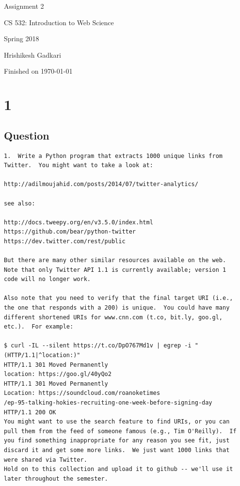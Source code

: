\documentclass[letterpaper,11pt]{article}
\begin{document}
\begin{titlepage}

\begin{center}

\Huge{Assignment 2}

\Large{CS 532:  Introduction to Web Science}

\Large{Spring 2018}

\Large{Hrishikesh Gadkari}

\Large Finished on \today

\end{center}

\end{titlepage}

\newpage


\section*{1}


\subsection*{Question}

\begin{verbatim}
1.  Write a Python program that extracts 1000 unique links from
Twitter.  You might want to take a look at:

http://adilmoujahid.com/posts/2014/07/twitter-analytics/

see also:

http://docs.tweepy.org/en/v3.5.0/index.html
https://github.com/bear/python-twitter
https://dev.twitter.com/rest/public

But there are many other similar resources available on the web.
Note that only Twitter API 1.1 is currently available; version 1
code will no longer work.

Also note that you need to verify that the final target URI (i.e.,
the one that responds with a 200) is unique.  You could have many
different shortened URIs for www.cnn.com (t.co, bit.ly, goo.gl,
etc.).  For example:

$ curl -IL --silent https://t.co/DpO767Md1v | egrep -i "(HTTP/1.1|^location:)"
HTTP/1.1 301 Moved Permanently
location: https://goo.gl/40yQo2
HTTP/1.1 301 Moved Permanently
Location: https://soundcloud.com/roanoketimes
/ep-95-talking-hokies-recruiting-one-week-before-signing-day
HTTP/1.1 200 OK
You might want to use the search feature to find URIs, or you can
pull them from the feed of someone famous (e.g., Tim O'Reilly).  If
you find something inappropriate for any reason you see fit, just
discard it and get some more links.  We just want 1000 links that
were shared via Twitter.
Hold on to this collection and upload it to github -- we'll use it
later throughout the semester.
\end{verbatim}
\end{document}
